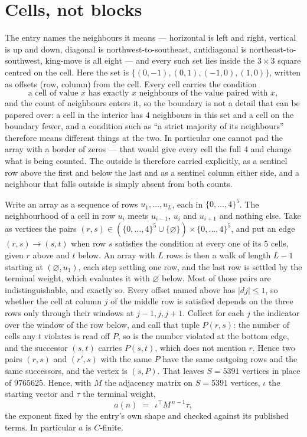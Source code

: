 \documentclass[11pt,a4paper]{article}
\theoremstyle{plain}
\theoremstyle{definition}
\begin{document}
\section{Cells, not blocks}

The entry names the neighbours it means --- horizontal is left and right, vertical is up and
down, diagonal is northwest-to-southeast, antidiagonal is northeast-to-southwest, king-move is
all eight --- and every such set lies inside the $3\times3$ square centred on the cell. Here
the set is $\{(0,-1), (0,1), (-1,0), (1,0)\}$, written as offsets (row, column) from the cell. Every cell carries
the condition
\[
\text{a cell of value }x\text{ has exactly }x\text{ neighbours of the value paired with }x,
\]
and the count of neighbours enters it, so the boundary is not a detail that can be papered
over: a cell in the interior has $4$ neighbours in this set and a cell on the boundary
fewer, and a condition such as ``a strict majority of its neighbours'' therefore means
different things at the two. In particular one cannot pad the array with a border of zeros ---
that would give every cell the full $4$ and change what is being counted. The outside is
therefore carried
explicitly, as a sentinel row above the first and below the last and as a sentinel column
either side, and a neighbour that falls outside is simply absent from both counts.

Write an array as a sequence of rows $u_1,\dots,u_L$, each in
$\{0,\dots,4\}^{5}$. The neighbourhood of a cell in row $u_i$ meets $u_{i-1}$,
$u_i$ and $u_{i+1}$ and nothing else. Take as vertices the pairs
$(r,s)\in(\{0,\dots,4\}^{5}\cup\{\varnothing\})\times\{0,\dots,4\}^{5}$,
and put an edge $(r,s)\to(s,t)$ when row $s$ satisfies the condition at every one of its
$5$ cells, given $r$ above and $t$ below. An array with $L$ rows is then a walk of length
$L-1$ starting at $(\varnothing,u_1)$, each step settling one row, and the last row is
settled by the terminal weight, which evaluates it with $\varnothing$ below. Most of those pairs are indistinguishable, and exactly so. Every offset named above has $|dj|\le 1$, so whether the cell at column $j$ of the middle row is satisfied depends on the three rows only through their windows at $j-1,j,j+1$. Collect for each $j$ the indicator over the window of the row below, and call that tuple $P(r,s)$: the number of cells any $t$ violates is read off $P$, so is the number violated at the bottom edge, and the successor $(s,t)$ carries $P(s,t)$, which does not mention $r$. Hence two pairs $(r,s)$ and $(r',s)$ with the same $P$ have the same outgoing rows and the same successors, and the vertex is $(s,P)$. That leaves $S=5391$ vertices in place of $9765625$. Hence,
with $M$ the adjacency matrix on $S=5391$ vertices, $\iota$ the starting vector and $\tau$ the
terminal weight,
\[
a(n)\;=\;\,\iota^{\!\top}M^{\,n-1}\tau ,
\]
the exponent fixed by the entry's own shape and checked against its published terms. In
particular $a$ is $C$-finite.
\end{document}
